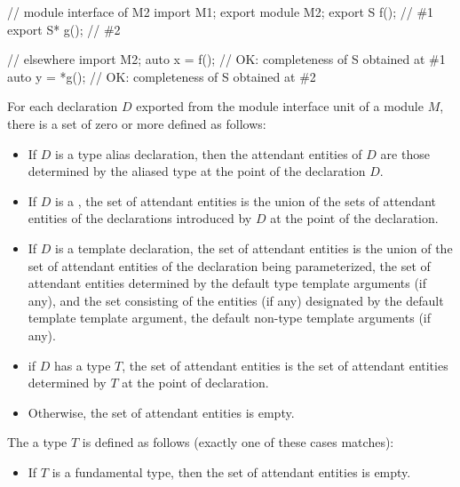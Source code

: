 \begin{std.txt}
\begin{before}
\begin{example}
\begin{codeblock}
      // module interface of M2
      import M1;
      export module M2;
      export S f();       // \#1
      export S* g();      // \#2

      // elsewhere
      import M2;
      auto x = f();       // OK: completeness of S obtained at \#1
      auto y = *g();      // OK: completeness of S obtained at \#2
    \end{codeblock}
  \end{example}
  \exitnote
\end{before}\begin{before}\color{addclr}
  For each declaration $D$ exported from the module interface unit of a module $M$,
   there is a set of zero or more
   defined as follows:
  \begin{itemize}
    \item If $D$ is a type alias declaration, then the attendant entities
    of $D$ are those determined by the aliased type at the point of the 
    declaration $D$.

    \item If $D$ is a , the set of attendant entities
    is the union of the sets of attendant entities of the declarations introduced by
    $D$ at the point of the declaration.

    \item If $D$ is a template declaration, the set of attendant entities is 
    the union of the set of attendant entities 
    of the declaration being parameterized, the set of attendant entities
    determined by the default type template arguments (if any), 
    and the set consisting of 
    the entities (if any) designated by the default template template argument,
    the default non-type template arguments (if any).

    \item if $D$ has a type $T$, the set of attendant entities is the set of 
    attendant entities determined by $T$ at the point of declaration.

    \item Otherwise, the set of attendant entities is empty.
  \end{itemize}
\end{before}\begin{before}\color{addclr}
  The  a type $T$ is defined as follows
  (exactly one of these cases matches):
  \begin{itemize}
    \item\color{addclr} If $T$ is a fundamental type, then
    the set of attendant entities is empty.


\end{itemize}
\end{before}
\end{std.txt}

